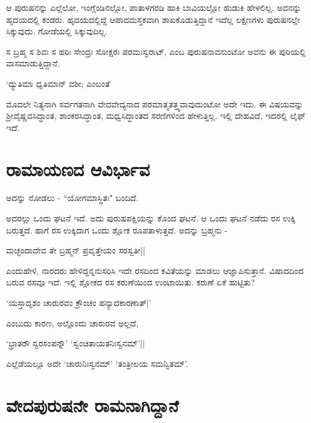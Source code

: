 ಆ ಪುರುಷನನ್ನು ಎಲ್ಲೆಲೋ, ಇಂಗ್ಲೆಂಡಿನಲ್ಲೋ, ಪಾತಾಳಗರಡಿ ಹಾಕಿ ಬಾವಿಯಲ್ಲೋ ಹುಡುಕಿ ಹೇಳಲಿಲ್ಲ. ಅವನನ್ನು ಹೃದಯದಲ್ಲಿ ಕಂಡರು. ಹೃದಯದಲ್ಲಿದ್ದೆ ಆಪಾದಮಸ್ತಕವಾಗಿ ಶಾಖಕೊಡುತ್ತಿದ್ದಾನೆ ಇದೆಲ್ಲ ಲಕ್ಷಣಗಳು ಪುರುಷನಲ್ಲೇ ಸಿಕ್ಕುವುದು. ಗೋಡೆಯಲ್ಲಿ ಸಿಕ್ಕುವುದಿಲ್ಲ. 

ಸ ಬ್ರಹ್ಮ ಸ ಶಿವಃ ಸ ಹರಿಃ ಸೇಂದ್ರಃ ಸೋಕ್ಷರಃ ಪರಮಃಸ್ವರಾಟ್, ಎಂಬ ಪುರುಷನಾವನುಂಟೋ ಅವನು ಈ ಪುರಿಯಲ್ಲಿ ವಾಸಮಾಡುತ್ತಿದ್ದಾನೆ.

\begin{shloka}
`ದ್ಯುತಿಮಾ ಧೃತಿಮಾನ್ ವಶೀ; ಎಂಬಂತೆ \label{249}
\end{shloka}

ಮೊದಲೇ ನಿತ್ಯನಾಗಿ ಸರ್ವಗತನಾಗಿ ವೇದವೇದ್ಯನಾದ ಪರಮಾತ್ಮತತ್ತ್ವವಾವುದುಂಟೋ ಅದೇ ಇದು. ಈ ವಿಷಯವನ್ನು ಶ್ರೀವೈಷ್ಣವಸಿದ್ಧಾಂತ, ಶಾಂಕರಸಿದ್ಧಾಂತ, ಮಧ್ವಸಿದ್ಧಾಂತದ ಸರಣಿಗಳಿಂದ ಹೇಳುತ್ತಿಲ್ಲ. ಇಲ್ಲಿ ದೇಹವಿದೆ, ಇದರಲ್ಲಿ ಲೈಫ್ ಇದೆ. 

\section*{ರಾಮಾಯಣದ ಆವಿರ್ಭಾವ}

\begin{shloka}
ಅದನ್ನು ನೋಡಲು - ``ಯೋಗಮಾಸ್ಥಿತಃ" ಬಂದಿದೆ.
\end{shloka}

ಅದರಲ್ಲು ಒಂದು ಘಟನೆ ಇದೆ. ಅದು ಪುರುಷಪಕ್ಷಿಯನ್ನು ಕೊಂದ ಘಟನೆ. ಆ ಒಂದು ಘಟನೆ ನಡೆದು ರಸ ಉಕ್ಕಿ ಬರುತ್ತದೆ. ಹಾಗೆ ರಸ ಉಕ್ಕಿದಾಗ ಒಂದು ಶ್ಲೋಕ ರೂಪತಾಳುತ್ತದೆ. ಅದನ್ನು ಬ್ರಹ್ಮನು -

\begin{shloka}
ಮಚ್ಛಂದಾದೇವ ತೇ ಬ್ರಹ್ಮನ್  ಪ್ರವೃತ್ತೇಯಂ ಸರಸ್ವತೀ||
\end{shloka}

ಎಂದುಹೇಳಿ, ನಾರದರು ಹೇಳಿದ್ದನ್ನನುಸರಿಸಿ ಇದೇ ರಸದಿಂದ ಕವಿತೆಯನ್ನು ಮಾಡಲು ಆಜ್ಞಾಪಿಸುತ್ತಾನೆ. ವಿಷಾದದಿಂದ ಬರುವ ರಸವೂ ಇದೆ. ಇಲ್ಲಿ ಶ್ಲೋಕದ ರಸ ಕರುಣೆಯಿಂದ ಉಂಟಾಯಿತು. ಕರುಣೆ ಏಕೆ ಹುಟ್ಟಿತು? 

\begin{shloka}
`ಯಸ್ತಾದೃಶಂ ಚಾರುರವಂ ಕ್ರೌಂಚಂ ಹನ್ಯಾದಕಾರಣಾತ್|'
\end{shloka}
ಎಂಬುದು ಕಾರಣ, ಅಲ್ಲೊಂದು ಚಾರುರವ ಅಲ್ಲದೆ, 

\begin{shloka}
`ಭ್ರಾತರೌ ಸ್ವರಸಂಪನ್ನೌ' `ಸ್ವಂಚಿತಾಯತನಿಃಸ್ವನಮ್'||
\end{shloka}

ಎಲ್ಲೆಡೆಯಲ್ಲೂ ಅದೇ `ಚಾರುನಿಃಸ್ವನಮ್'\label{250} `ತಂತ್ರೀಲಯ ಸಮನ್ವಿತಮ್'.

\section*{ವೇದಪುರುಷನೇ ರಾಮನಾಗಿದ್ದಾನೆ}

